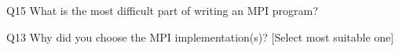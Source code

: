 \begin{description}%
\item{Q15} What is the most difficult part of writing an MPI program?%
\item{Q13} Why did you choose the MPI implementation(s)? [Select most suitable one]%
\end{description}%
